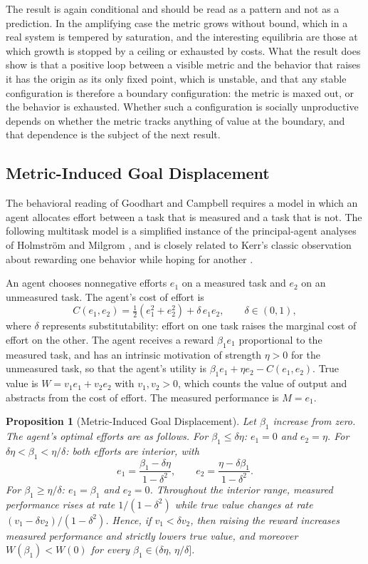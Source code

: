\documentclass[11pt]{report}
\newtheorem{proposition}[theorem]{Proposition}
\theoremstyle{definition}
\theoremstyle{remark}
\begin{document}
The result is again conditional and should be read as a pattern and not as a prediction. In the amplifying case the metric grows without bound, which in a real system is tempered by saturation, and the interesting equilibria are those at which growth is stopped by a ceiling or exhausted by costs. What the result does show is that a positive loop between a visible metric and the behavior that raises it has the origin as its only fixed point, which is unstable, and that any stable configuration is therefore a boundary configuration: the metric is maxed out, or the behavior is exhausted. Whether such a configuration is socially unproductive depends on whether the metric tracks anything of value at the boundary, and that dependence is the subject of the next result.

\subsection*{Metric-Induced Goal Displacement}

The behavioral reading of Goodhart and Campbell requires a model in which an agent allocates effort between a task that is measured and a task that is not. The following multitask model is a simplified instance of the principal-agent analyses of Holmstr\"om and Milgrom \cite{holmstrom}, and is closely related to Kerr's classic observation about rewarding one behavior while hoping for another \cite{kerr}.

An agent chooses nonnegative efforts $e_1$ on a measured task and $e_2$ on an unmeasured task. The agent's cost of effort is
\[
C(e_1,e_2)=\tfrac12\left(e_1^2+e_2^2\right)+\delta\,e_1e_2,\qquad \delta\in(0,1),
\]
where $\delta$ represents substitutability: effort on one task raises the marginal cost of effort on the other. The agent receives a reward $\beta_1 e_1$ proportional to the measured task, and has an intrinsic motivation of strength $\eta>0$ for the unmeasured task, so that the agent's utility is $\beta_1e_1+\eta e_2-C(e_1,e_2)$. True value is $W=v_1e_1+v_2e_2$ with $v_1,v_2>0$, which counts the value of output and abstracts from the cost of effort. The measured performance is $M=e_1$.

\begin{proposition}[Metric-Induced Goal Displacement]\label{prop:displace}
Let $\beta_1$ increase from zero. The agent's optimal efforts are as follows.
For $\beta_1\le\delta\eta$: $e_1=0$ and $e_2=\eta$.
For $\delta\eta<\beta_1<\eta/\delta$: both efforts are interior, with
\[
e_1=\frac{\beta_1-\delta\eta}{1-\delta^2},\qquad e_2=\frac{\eta-\delta\beta_1}{1-\delta^2}.
\]
For $\beta_1\ge\eta/\delta$: $e_1=\beta_1$ and $e_2=0$.
Throughout the interior range, measured performance rises at rate $1/(1-\delta^2)$ while true value changes at rate $(v_1-\delta v_2)/(1-\delta^2)$. Hence, if $v_1<\delta v_2$, then raising the reward increases measured performance and strictly lowers true value, and moreover $W(\beta_1)<W(0)$ for every $\beta_1\in(\delta\eta,\,\eta/\delta]$.
\end{proposition}
\end{document}
